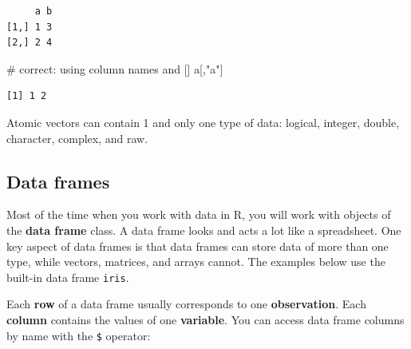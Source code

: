 \documentclass[
  13,
  letterpaper,
]{report}
\newenvironment{Shaded}{\begin{snugshade}}{\end{snugshade}}
\newcommand{\CommentTok}[1]{\textcolor[rgb]{0.37,0.37,0.37}{#1}}
\newcommand{\NormalTok}[1]{\textcolor[rgb]{0.00,0.23,0.31}{#1}}
\newcommand{\SpecialCharTok}[1]{\textcolor[rgb]{0.37,0.37,0.37}{#1}}
\newcommand{\StringTok}[1]{\textcolor[rgb]{0.13,0.47,0.30}{#1}}
\begin{document}
\begin{verbatim}
     a b
[1,] 1 3
[2,] 2 4
\end{verbatim}

\begin{Shaded}
\end{Shaded}

\begin{Shaded}
\begin{Highlighting}[]
\CommentTok{\# correct: using column names and []}
\NormalTok{a[,}\StringTok{"a"}\NormalTok{]}
\end{Highlighting}
\end{Shaded}

\begin{verbatim}
[1] 1 2
\end{verbatim}

Atomic vectors can contain 1 and only one type of data: logical,
integer, double, character, complex, and raw.

\subsection{Data frames}\label{sec-03-struct-df}

Most of the time when you work with data in R, you will work with
objects of the \textbf{data frame} class. A data frame looks and acts a
lot like a spreadsheet. One key aspect of data frames is that data
frames can store data of more than one type, while vectors, matrices,
and arrays cannot. The examples below use the built-in data frame
\texttt{iris}.

Each \textbf{row} of a data frame usually corresponds to one
\textbf{observation}. Each \textbf{column} contains the values of one
\textbf{variable}. You can access data frame columns by name with the
\texttt{\$} operator:

\begin{Shaded}
\end{Shaded}
\end{document}
